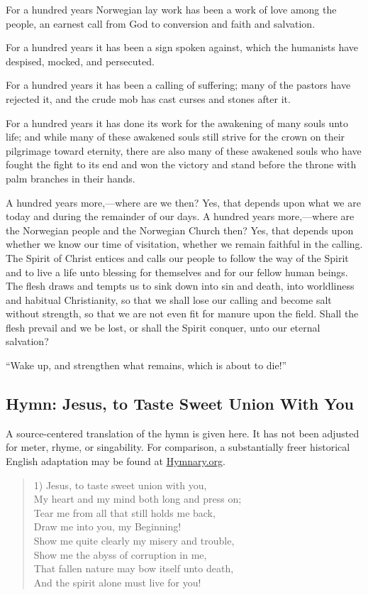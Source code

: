 For a hundred years Norwegian lay work has been a work of love among the people, an earnest call from God to conversion and faith and salvation.

For a hundred years it has been a sign spoken against, which the humanists have despised, mocked, and persecuted.

For a hundred years it has been a calling of suffering; many of the pastors have rejected it, and the crude mob has cast curses and stones after it.

For a hundred years it has done its work for the awakening of many souls unto life; and while many of these awakened souls still strive for the crown on their pilgrimage toward eternity, there are also many of these awakened souls who have fought the fight to its end and won the victory and stand before the throne with palm branches in their hands.

A hundred years more,—where are we then? Yes, that depends upon what we are today and during the remainder of our days. A hundred years more,—where are the Norwegian people and the Norwegian Church then? Yes, that depends upon whether we know our time of visitation, whether we remain faithful in the calling. The Spirit of Christ entices and calls our people to follow the way of the Spirit and to live a life unto blessing for themselves and for our fellow human beings. The flesh draws and tempts us to sink down into sin and death, into worldliness and habitual Christianity, so that we shall lose our calling and become salt without strength, so that we are not even fit for manure upon the field. Shall the flesh prevail and we be lost, or shall the Spirit conquer, unto our eternal salvation?

“Wake up, and strengthen what remains, which is about to die!”


\subsection{Hymn: Jesus, to Taste Sweet Union With You}
A source-centered translation of the hymn is given here. It has not been adjusted for meter, rhyme, or singability. For comparison, a substantially freer historical English adaptation may be found at \href{https://hymnary.org/text/jesus_i_long_for_thy_blessed_communion?utm_source=chatgpt.com}{Hymnary.org}.

\begin{verse}
1) Jesus, to taste sweet union with you,\\
My heart and my mind both long and press on;\\
Tear me from all that still holds me back,\\
Draw me into you, my Beginning!\\
Show me quite clearly my misery and trouble,\\
Show me the abyss of corruption in me,\\
That fallen nature may bow itself unto death,\\
And the spirit alone must live for you!\\
\end{verse}

